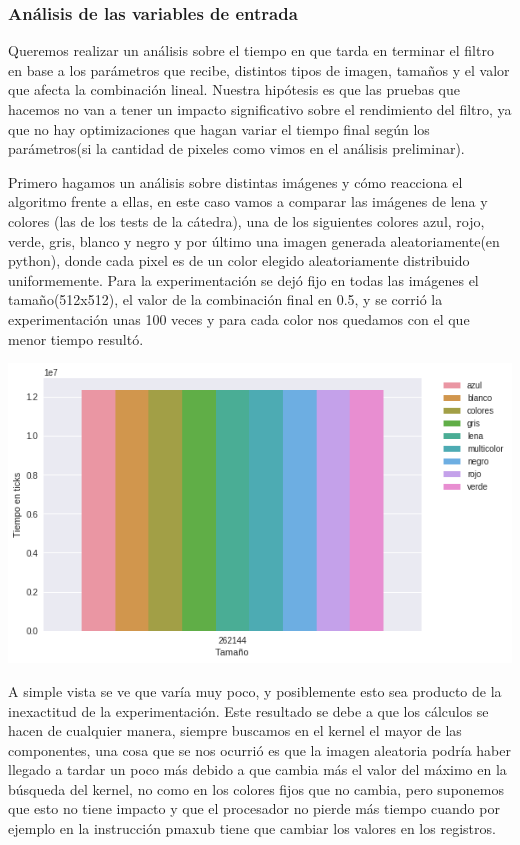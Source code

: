 \subsubsection*{Análisis de las variables de entrada}

Queremos realizar un análisis sobre el tiempo en que tarda en terminar el filtro en base a los parámetros que recibe, distintos tipos de imagen, tamaños y el valor que afecta la combinación lineal. Nuestra hipótesis es que las pruebas que hacemos no van a tener un impacto significativo sobre el rendimiento del filtro, ya que no hay optimizaciones que hagan variar el tiempo final según los parámetros(si la cantidad de pixeles como vimos en el análisis preliminar).

Primero hagamos un análisis sobre distintas imágenes y cómo reacciona el algoritmo frente a ellas, en este caso vamos a comparar las imágenes de lena y colores (las de los tests de la cátedra), una de los siguientes colores azul, rojo, verde, gris, blanco y negro y por último una imagen generada aleatoriamente(en python), donde cada pixel es de un color elegido aleatoriamente distribuido uniformemente. Para la experimentación se dejó fijo en todas las imágenes el tamaño(512x512), el valor de la combinación final en 0.5, y se corrió la experimentación unas 100 veces y para cada color nos quedamos con el que menor tiempo resultó.

\begin{center} 
	\includegraphics[scale=0.5]{img/maxCloser_PARAM_IMG.png}
\end{center}

A simple vista se ve que varía muy poco, y posiblemente esto sea producto de la inexactitud de la experimentación. Este resultado se debe a que los cálculos se hacen de cualquier manera, siempre buscamos en el kernel el mayor de las componentes, una cosa que se nos ocurrió es que la imagen aleatoria podría haber llegado a tardar un poco más debido a que cambia más el valor del máximo en la búsqueda del kernel, no como en los colores fijos que no cambia, pero suponemos que esto no tiene impacto y que el procesador no pierde más tiempo cuando por ejemplo en la instrucción pmaxub tiene que cambiar los valores en los registros.


